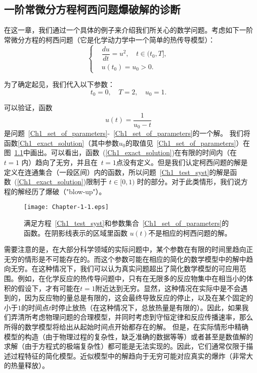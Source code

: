 \documentclass[twoside]{book}
\begin{document}
\begin{CJK*}{GBK}{song}

\newpage
\chapter{一阶常微分方程柯西问题爆破解的诊断}\label{Chapter_1}

在这一章，我们通过一个具体的例子来介绍我们所关心的数学问题。考虑如下一阶常微分方程的柯西问题（它是化学动力学中一个简单的热传导模型）：
\begin{equation}{}
    \label{Ch1_test_syst}
    \left\{
    \begin{aligned}
        &\dfrac{d u}{d t} = u^2, \quad t \in (t_0,T], \\
        &u(t_0) = u_0 > 0.
    \end{aligned}
    \right.
\end{equation}

为了确定起见，我们代入以下参数：
\begin{equation}
    \label{Ch1_set_of_parameters}
    t_0 = 0, \quad T = 2, \quad u_0 = 1.
\end{equation}

可以验证，函数
\begin{equation}
    \label{Ch1_exact_solution}
    u(t) = \dfrac{1}{u_0 - t}
\end{equation}
是问题~\eqref{Ch1_set_of_parameters}-~\eqref{Ch1_set_of_parameters}的一个解。 我们将函数\eqref{Ch1_exact_solution}（其中参数$u_0$的取值见~\eqref{Ch1_set_of_parameters}）在图~\ref{Fig_1_1}中画出。可以看出，函数~(\ref{Ch1_exact_solution})在有限的时间内（在~$t=1$ 内）趋向了无穷，并且在~$t=1$点没有定义。但是我们认定柯西问题的解是定义在连通集合（一段区间）内的函数，所以问题~\eqref{Ch1_test_syst}的解是函数~(\ref{Ch1_exact_solution})限制于 $t \in [0,1)$ 时的部分。对于此类情形，我们说方程的解经历了爆破（"blow-up"）。
\begin{figure}[!htb]
    \centering
    \texttt{[image: Chapter-1-1.eps]}\\
    \caption{满足方程~\eqref{Ch1_test_syst}和参数集合~\eqref{Ch1_set_of_parameters}的函数。在阴影线表示的区域里函数 $u(t)$不是相应的柯西问题的解。}
    \label{Fig_1_1}
\end{figure}

需要注意的是，在大部分科学领域的实际问题中，某个参数在有限的时间里趋向正无穷的情形是不可能存在的。而这个参数可能在相应的简化的数学模型中的解中趋向无穷。在这种情况下，我们可以认为真实问题超出了简化数学模型的可应用范围。例如，在化学反应的热传导问题中，只有在无限多的反应物集中在相当小的体积的假设下，才有可能在$ t = 1 $附近达到无穷。显然，这种情况在实际中是不会遇到的，因为反应物的量总是有限的，这会最终导致反应的停止，以及在某个固定的小于$1$的时间点$t$时停止放热（在这种情况下，总放热量是有限的）。因此，如果我们弄清所考虑物理问题的合理模型，并同时考虑到守恒定律和反应传播速率，那么所得的数学模型将给出从起始时间点开始都存在的解。 但是，在实际情形中精确模型的构造（由于物理过程的复杂性，缺乏准确的数据等等）或者甚至是数值解的求解（由于方程式的极端复杂性）都可能是无法实现的。因此，它们通常仅限于描述过程特征的简化模型。近似模型中的解趋向于无穷可能对应真实的爆炸（非常大的热量释放）。


\end{CJK*}
\end{document}
